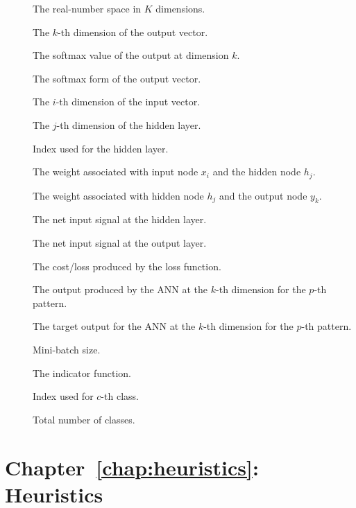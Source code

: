 \begin{description}
	\item [\parbox{1cm}{$\mathbb{R}^{K}$}] The real-number space in $K$ dimensions.
	\item [\parbox{1cm}{$y_{k}$}] The $k$-th dimension of the output vector.
	\item [\parbox{1cm}{$y^{'}_k$}] The softmax value of the output at dimension $k$.
	\item [\parbox{1cm}{$\boldsymbol{y^{'}}$}] The softmax form of the output vector.
	\item [\parbox{1cm}{$x_{i}$}] The $i$-th dimension of the input vector.
	\item [\parbox{1cm}{$h_{j}$}] The $j$-th dimension of the hidden layer.
	\item [\parbox{1cm}{$j$}] Index used for the hidden layer.
	\item [\parbox{1cm}{$v_{i,j}$}] The weight associated with input node $x_{i}$ and the hidden node $h_{j}$.
	\item [\parbox{1cm}{$w_{j,k}$}] The weight associated with hidden node $h_{j}$ and the output node $y_{k}$.
	\item [\parbox{1cm}{$net_{i,h}$}] The net input signal at the hidden layer.
	\item [\parbox{1cm}{$net_{h,y}$}] The net input signal at the output layer.
	\item [\parbox{1cm}{$\epsilon$}] The cost/loss produced by the loss function.
	\item [\parbox{1cm}{$y_{k,p}$}] The output produced by the \acs{ANN} at the $k$-th dimension for the $p$-th pattern.
	\item [\parbox{1cm}{$\hat{y}_{k,p}$}] The target output for the \acs{ANN} at the $k$-th dimension for the $p$-th pattern.
	\item [\parbox{1cm}{$\beta$}] Mini-batch size.
	\item [\parbox{1cm}{$\mathbbm{1}$}] The indicator function.
	\item [\parbox{1cm}{$c$}] Index used for $c$-th class.
	\item [\parbox{1cm}{$C$}] Total number of classes.

\end{description}

\section{Chapter~\ref{chap:heuristics}: Heuristics}
\label{sec:symbols:heuristics}

